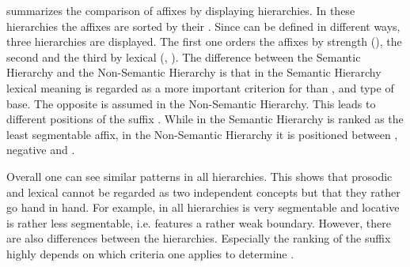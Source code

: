  summarizes the comparison of affixes by displaying  hierarchies. In these  hierarchies the affixes are sorted by their . Since  can be defined in different ways, three hierarchies are displayed. The first one orders the affixes by  strength (), the second and the third by lexical  (, ). The difference between the {Semantic Hierarchy} and the {Non-Semantic Hierarchy} is that in the {Semantic Hierarchy}  lexical meaning is regarded as a more important criterion for  than ,  and type of base. The opposite is assumed in the {Non-Semantic Hierarchy}. This leads to different positions of the suffix . While in the {Semantic Hierarchy}  is ranked as the least segmentable affix, in the {Non-Semantic Hierarchy} it is positioned between , negative  and .

Overall one can see similar patterns in all hierarchies. This shows that prosodic and lexical  cannot be regarded as two independent concepts but that they rather go hand in hand. For example, in all hierarchies  is very segmentable and locative  is rather less segmentable, i.e. features a rather weak boundary. However, there are also differences between the hierarchies. Especially the ranking of the suffix  highly depends on which criteria one applies to determine .


